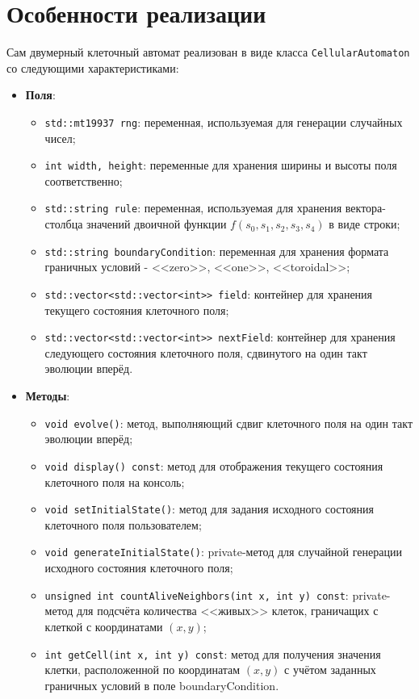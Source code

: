 \documentclass[a4paper, final]{article}
\begin{document}
\section{Особенности реализации}
Сам двумерный клеточный автомат реализован в виде класса \texttt{CellularAutomaton} со следующими
характеристиками:
\begin{itemize}
  \item \textbf{Поля}:
  \begin{itemize}
    \item \texttt{std::mt19937 rng}: переменная, используемая для генерации случайных чисел;
    \item \texttt{int width, height}: переменные для хранения ширины и высоты поля соответственно;
    \item \texttt{std::string rule}: переменная, используемая для хранения вектора-столбца значений
    двоичной функции $f(s_0, s_1, s_2, s_3, s_4)$ в виде строки;
    \item \texttt{std::string boundaryCondition}: переменная для хранения формата граничных условий -
    <<zero>>, <<one>>, <<toroidal>>;
    \item \texttt{std::vector<std::vector<int>> field}: контейнер для хранения текущего состояния
    клеточного поля;
    \item \texttt{std::vector<std::vector<int>> nextField}: контейнер для хранения следующего
    состояния клеточного поля, сдвинутого на один такт эволюции вперёд.
  \end{itemize}
  
  \item \textbf{Методы}:
  \begin{itemize}
    \item \texttt{void evolve()}: метод, выполняющий сдвиг клеточного поля на один такт эволюции
    вперёд;
    \item \texttt{void display() const}: метод для отображения текущего состояния клеточного поля
    на консоль;
    \item \texttt{void setInitialState()}: метод для задания исходного состояния клеточного поля
    пользователем;
    \item \texttt{void generateInitialState()}: private-метод для случайной генерации исходного 
    состояния клеточного поля;
    \item \texttt{unsigned int countAliveNeighbors(int x, int y) const}: private-метод для подсчёта
    количества <<живых>> клеток, граничащих с клеткой с координатами $(x,  y)$;
    \item \texttt{int getCell(int x, int y) const}: метод для получения значения клетки, расположенной
    по координатам $(x, y)$ с учётом заданных граничных условий в поле boundaryCondition.
  \end{itemize}
\end{itemize}
\end{document}
